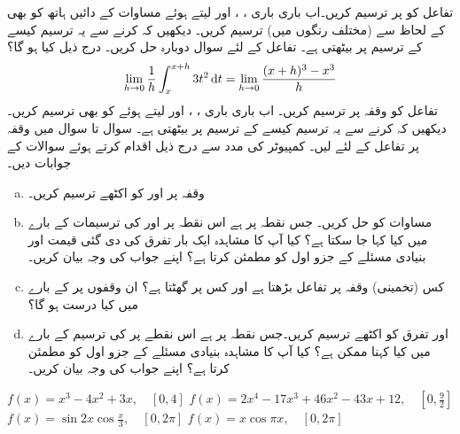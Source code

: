 تفاعل  کو  پر ترسیم کریں۔اب باری باری ، ،  اور  لیتے ہوئے مساوات  کے دائیں ہاتھ کو بھی  کے لحاظ سے (مختلف رنگوں میں) ترسیم کریں۔ دیکھیں کہ  کرنے سے یہ ترسیم کیسے  کے ترسیم پر بیٹھتی ہے۔ 
تفاعل  کے لئے سوال  دوبارہ حل کریں۔ درج ذیل کیا ہو گا؟
\begin{align*}
\lim_{h\to0}\frac{1}{h}\int_x^{x+h}3t^2\dif t=\lim_{h\to 0}\frac{(x+h)^3-x^3}{h}
\end{align*}
 تفاعل  کو وقفہ  پر ترسیم کریں۔ اب باری باری ، ،  اور   لیتے ہوئے  کو بھی ترسیم کریں۔ دیکھیں کہ  کرنے سے یہ ترسیم کیسے  کے ترسیم پر بیٹھتی  ہے۔
سوال  تا سوال  میں وقفہ  پر تفاعل  کے لئے  لیں۔ کمپیوٹر کی مدد سے درج ذیل اقدام کرتے ہوئے سوالات کے جوابات دیں۔
\begin{enumerate}[a.]
\item
وقفہ  پر  اور  کو اکٹھے ترسیم کریں۔
\item
مساوات  کو حل کریں۔ جس نقطہ پر   ہے اس نقطہ پر  اور  کی ترسیمات کے بارے میں کیا کہا جا سکتا ہے؟ کیا آپ کا مشاہدہ ایک بار تفرق کی دی گئی قیمت اور بنیادی مسئلے کے جزو اول کو مطمئن کرتا ہے؟ اپنے جواب کی وجہ بیان کریں۔
\item
کس (تخمینی) وقفہ پر تفاعل  بڑھتا ہے اور کس پر گھٹتا ہے؟ ان وقفوں پر  کے بارے میں کیا درست ہو گا؟
\item
{} اور تفرق  کو اکٹھے ترسیم کریں۔جس نقطہ پر  ہے اس نقطے پر  کی ترسیم کے بارے میں کیا کہنا ممکن ہے؟ کیا آپ کا مشاہدہ بنیادی مسئلے کے جزو اول کو مطمئن کرتا ہے؟ اپنے جواب کی وجہ بیان کریں۔ 
\end{enumerate} 
$f(x)=x^3-4x^2+3x,\quad [0,4]$
$f(x)=2x^4-17x^3+46x^2-43x+12,\quad [0,\tfrac{9}{2}]$
$f(x)=\sin2x\cos\tfrac{x}{3},\quad [0,2\pi]$
$f(x)=x\cos \pi x,\quad [0,2\pi]$
